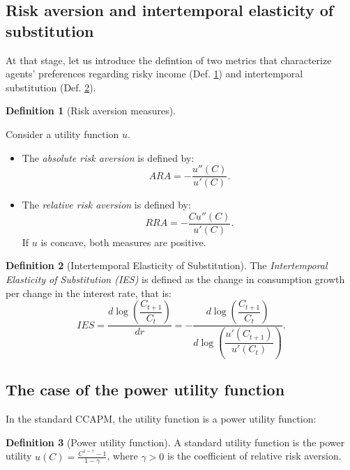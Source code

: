 \documentclass[
  12pt,
]{book}
\providecommand{\tightlist}{%
  \setlength{\itemsep}{0pt}\setlength{\parskip}{0pt}}
\theoremstyle{definition}
\newtheorem{definition}{Definition}[chapter]
\theoremstyle{definition}
\theoremstyle{definition}
\theoremstyle{definition}
\theoremstyle{remark}
\begin{document}
\hypertarget{risk-aversion-and-intertemporal-elasticity-of-substitution}{%
\subsection{Risk aversion and intertemporal elasticity of substitution}\label{risk-aversion-and-intertemporal-elasticity-of-substitution}}

At that stage, let us introduce the defintion of two metrics that characterize agents' preferences regarding risky income (Def. \ref{def:RAmeasures}) and intertemporal substitution (Def. \ref{def:IES}).

\begin{definition}[Risk aversion measures]
\protect\hypertarget{def:RAmeasures}{}\label{def:RAmeasures}

Consider a utility function \(u\).

\begin{itemize}
\tightlist
\item
  The \emph{absolute risk aversion} is defined by:
  \[
  ARA = - \frac{u''(C)}{u'(C)}.
  \]
\item
  The \emph{relative risk aversion} is defined by:
  \[
  RRA = - \frac{C u''(C)}{u'(C)}.
  \]
  If \(u\) is concave, both measures are positive.
\end{itemize}

\end{definition}

\begin{definition}[Intertemporal Elasticity of Substitution]
\protect\hypertarget{def:IES}{}\label{def:IES}The \emph{Intertemporal Elasticity of Substitution (IES)} is defined as the change in consumption growth per change in the interest rate, that is:
\[
IES = \frac{d \log\left( \dfrac{C_{t+1}}{C_{t}}\right)}{d r} = - \frac{d \log\left( \dfrac{C_{t+1}}{C_{t}}\right)}{d\log\left(\dfrac{u'(C_{t+1})}{u'(C_{t})}\right)}.
\]
\end{definition}

\hypertarget{the-case-of-the-power-utility-function}{%
\subsection{The case of the power utility function}\label{the-case-of-the-power-utility-function}}

In the standard CCAPM, the utility function is a power utility function:

\begin{definition}[Power utility function]
\protect\hypertarget{def:CCAPM}{}\label{def:CCAPM}A standard utility function is the power utility \(u(C) = \frac{C^{1-\gamma}-1}{1-\gamma}\), where \(\gamma>0\) is the coefficient of relative risk aversion.
\end{definition}
\end{document}
